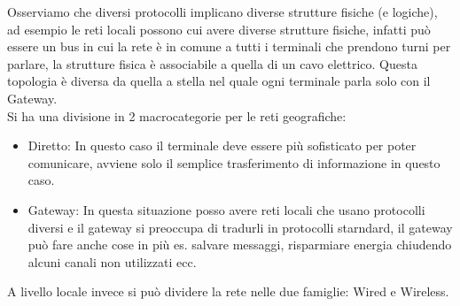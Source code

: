 \documentclass[11pt, twocolumn]{article}
\newenvironment{myitemize}
{ \begin{itemize}[topsep=0ex]
		\setlength{\itemsep}{0pt}
		\setlength{\parskip}{0pt}
		\setlength{\parsep}{0pt}     }
	{ \end{itemize}                  }
\begin{document}
Osserviamo che diversi protocolli implicano diverse strutture fisiche (e logiche), ad esempio le reti locali possono  cui avere diverse strutture fisiche, infatti può essere un bus in cui la rete è in comune a tutti i terminali che prendono turni per parlare, la strutture fisica è associabile a quella di un cavo elettrico.
Questa topologia è diversa da quella a stella nel quale ogni terminale parla solo con il Gateway.\\
Si ha una divisione in 2 macrocategorie per le reti geografiche:
\begin{myitemize}
  \item Diretto: In questo caso il terminale deve essere più sofisticato per poter comunicare, avviene solo il semplice trasferimento di informazione in questo caso.
  \item Gateway: In questa situazione posso avere reti locali che usano protocolli diversi e il gateway si preoccupa di tradurli in protocolli starndard, il gateway può fare anche cose in più es. salvare messaggi, risparmiare energia chiudendo alcuni canali non utilizzati ecc. 
\end{myitemize}
A livello locale invece si può dividere la rete nelle due famiglie: Wired e Wireless.
\end{document}
